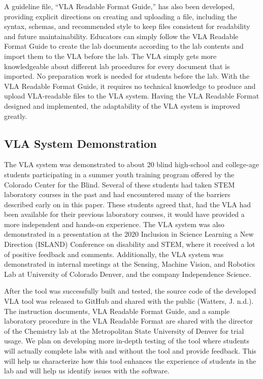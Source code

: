 \documentclass[11.5pt]{sig-alternate} %
\begin{document}
\begin{large}
A guideline file, “VLA Readable Format Guide,” has also been developed, providing explicit directions on creating and uploading a file, including the syntax, schemas, and recommended style to keep files consistent for readability and future maintainability. Educators can simply follow the VLA Readable Format Guide to create the lab documents according to the lab contents and import them to the VLA before the lab. The VLA simply gets more knowledgeable about different lab procedures for every document that is imported. No preparation work is needed for students before the lab. With the VLA Readable Format Guide, it requires no technical knowledge to produce and upload VLA-readable files to the VLA system. Having the VLA Readable Format designed and implemented, the adaptability of the VLA system is improved greatly.

\subsection*{VLA System Demonstration}

The VLA system was demonstrated to about 20 blind high-school and college-age students participating in a summer youth training program offered by the Colorado Center for the Blind. Several of these students had taken STEM laboratory courses in the past and had encountered many of the barriers described early on in this paper. These students agreed that, had the VLA had been available for their previous laboratory courses, it would have provided a more independent and hands-on experience. The VLA system was also demonstrated in a presentation at the 2020 Inclusion in Science Learning a New Direction (ISLAND) Conference on disability and STEM, where it received a lot of positive feedback and comments. Additionally, the VLA system was demonstrated in internal meetings at the Sensing, Machine Vision, and Robotics Lab at University of Colorado Denver, and the company Independence Science. 

After the tool was successfully built and tested, the source code of the developed VLA tool was released to GitHub and shared with the public (Watters, J. n.d.). The instruction documents, VLA Readable Format Guide, and a sample laboratory procedure in the VLA Readable Format are shared with the director of the Chemistry lab at the Metropolitan State University of Denver for trial usage. We plan on developing more in-depth testing of the tool where students will actually complete labs with and without the tool and provide feedback. This will help us characterize how this tool enhances the experience of students in the lab and will help us identify issues with the software.


\end{large}
\end{document}
